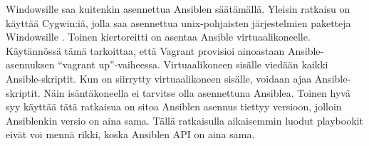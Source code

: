 Windowsille saa kuitenkin asennettua Ansiblen säätämällä. Yleisin ratkaisu on käyttää Cygwin:iä, jolla saa asennettua unix-pohjaisten järjestelmien paketteja Windowsille \cite{link:cygwin}. Toinen kiertoreitti on asentaa Ansible virtuaalikoneelle. Käytännössä tämä tarkoittaa, että Vagrant provisioi ainoastaan Ansible-asennuksen \enquote{vagrant up}-vaiheessa. Virtuaalikoneen sisälle viedään kaikki Ansible-skriptit. Kun on siirrytty virtuaalikoneen sisälle, voidaan ajaa Ansible-skriptit. Näin isäntäkoneella ei tarvitse olla asennettuna Ansiblea. Toinen hyvä syy käyttää tätä ratkaisua on sitoa Ansiblen asennus tiettyy versioon, jolloin Ansiblenkin versio on aina sama. Tällä ratkaisulla aikaisemmin luodut playbookit eivät voi mennä rikki, koska Ansiblen API on aina sama.